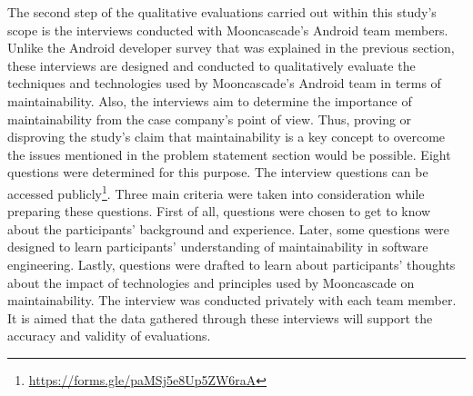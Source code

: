 The second step of the qualitative evaluations carried out within this study’s scope is the interviews conducted with Mooncascade's Android team members. Unlike the Android developer survey that was explained in the previous section, these interviews are designed and conducted to qualitatively evaluate the techniques and technologies used by Mooncascade's Android team in terms of maintainability. Also, the interviews aim to determine the importance of maintainability from the case company's point of view.  Thus, proving or disproving the study's claim that maintainability is a key concept to overcome the issues mentioned in the problem statement section would be possible. Eight questions were determined for this purpose. The interview questions can be accessed publicly\footnote{\url{https://forms.gle/paMSj5e8Up5ZW6raA}}. Three main criteria were taken into consideration while preparing these questions. First of all, questions were chosen to get to know about the participants' background and experience. Later, some questions were designed to learn participants' understanding of maintainability in software engineering. Lastly, questions were drafted to learn about participants' thoughts about the impact of technologies and principles used by Mooncascade on maintainability. The interview was conducted privately with each team member.  It is aimed that the data gathered through these interviews will support the accuracy and validity of evaluations.